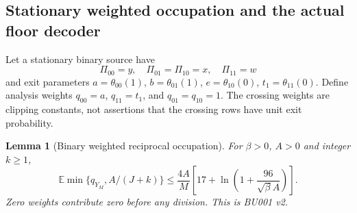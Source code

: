 \documentclass[11pt,letterpaper]{article}
\newtheorem{lemma}[theorem]{Lemma}
\theoremstyle{definition}\newtheorem{definition}[theorem]{Definition}
\theoremstyle{remark}\newtheorem{remark}[theorem]{Remark}
\newcommand{\E}{\mathbb{E}}
\newcommand{\unit}[1]{\textsf{#1}}
\begin{document}
\subsection{Stationary weighted occupation and the actual floor decoder}
Let a stationary binary source have
\[
 \Pi_{00}=y,\quad \Pi_{01}=\Pi_{10}=x,\quad \Pi_{11}=w
\]
and exit parameters
$a=\theta_{00}(1)$, $b=\theta_{01}(1)$,
$e=\theta_{10}(0)$, $t_1=\theta_{11}(0)$.
Define analysis weights
$q_{00}=a$, $q_{11}=t_1$, and $q_{01}=q_{10}=1$.
The crossing weights are clipping constants, not assertions that the crossing rows have unit exit probability.
\begin{lemma}[Binary weighted reciprocal occupation]\label{lem:binaryreturn}
For $\beta>0$, $A>0$ and integer $k\ge1$,
\begin{equation}\label{eq:binaryreturn}
 \E\min\{q_{Y_M},A/(J+k)\}
 \le\frac{4A}{M}\left[17+\ln\left(1+\frac{96}{\sqrt\beta A}\right)\right].
\end{equation}
Zero weights contribute zero before any division. This is \unit{BU001 v2}.
\end{lemma}
\end{document}
